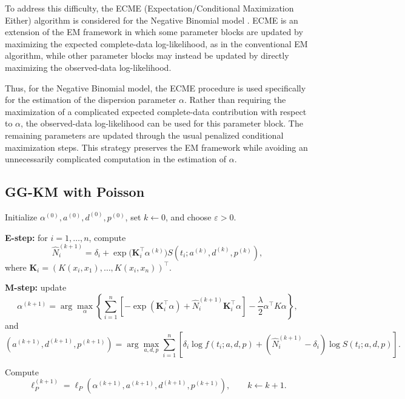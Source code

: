 To address this difficulty, the ECME (Expectation/Conditional
Maximization Either) algorithm is considered for the Negative Binomial
model \cite{mclachlan2008algorithm}. ECME is an extension of the EM
framework in which some parameter blocks are updated by maximizing the
expected complete-data log-likelihood, as in the conventional EM
algorithm, while other parameter blocks may instead be updated by
directly maximizing the observed-data log-likelihood.

Thus, for the Negative Binomial model, the ECME procedure is used
specifically for the estimation of the dispersion parameter $\alpha$.
Rather than requiring the maximization of a complicated expected
complete-data contribution with respect to $\alpha$, the observed-data
log-likelihood can be used for this parameter block. The remaining
parameters are updated through the usual penalized conditional
maximization steps. This strategy preserves the EM framework while
avoiding an unnecessarily complicated computation in the estimation of
$\alpha$.

\subsection{GG-KM with Poisson}

\begin{algorithm}[H]
\caption{Penalized EM algorithm for the GG-KM model -
$N_i \sim \mathrm{Poisson}\!\bigl(\theta(\mathbf{x}_i)\bigr)$.}
\begin{algorithmic}[1]

\State Initialize $\alpha^{(0)},a^{(0)},d^{(0)},p^{(0)}$, set $k\gets0$, and choose $\varepsilon>0$.


\State \textbf{E-step:} for $i=1,\ldots,n$, compute
\[
\widehat N_i^{(k+1)}
=
\delta_i+
\exp\!\bigl(\mathbf{K}_i^\top\alpha^{(k)}\bigr)
S\!\left(t_i;a^{(k)},d^{(k)},p^{(k)}\right),
\]
where $\mathbf{K}_i=(K(x_i,x_1),\ldots,K(x_i,x_n))^\top$.

\State \textbf{M-step:} update
\[
\alpha^{(k+1)}
=
\arg\max_{\alpha}
\left\{
\sum_{i=1}^{n}
\left[
-\exp(\mathbf{K}_i^\top\alpha)
+\widehat N_i^{(k+1)}\mathbf{K}_i^\top\alpha
\right]
-\frac{\lambda}{2}\alpha^\top K\alpha
\right\},
\]
and
\[
(a^{(k+1)},d^{(k+1)},p^{(k+1)})
=
\arg\max_{a,d,p}
\sum_{i=1}^{n}
\left[
\delta_i\log f(t_i;a,d,p)
+
(\widehat N_i^{(k+1)}-\delta_i)
\log S(t_i;a,d,p)
\right].
\]

\State Compute
\[
\ell_P^{(k+1)}
=
\ell_P\!\left(
\alpha^{(k+1)},a^{(k+1)},d^{(k+1)},p^{(k+1)}
\right),
\qquad k\gets k+1.
\]

\EndWhile

\end{algorithmic}
\end{algorithm}


